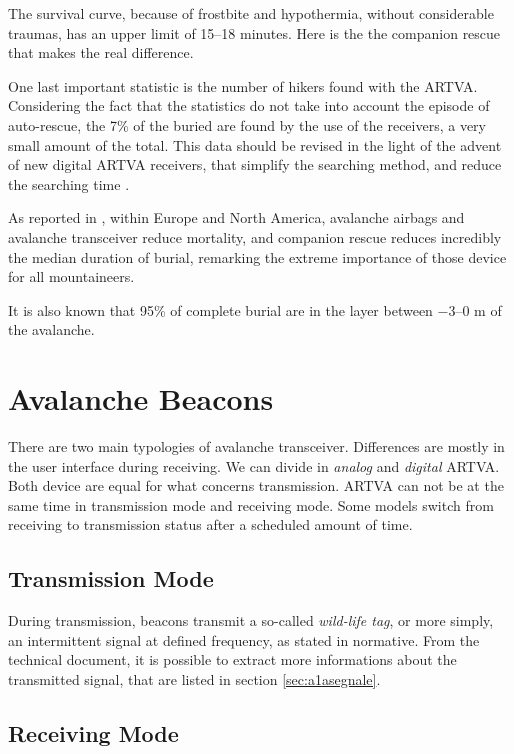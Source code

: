 The survival curve, because of frostbite and hypothermia, without considerable traumas, has an upper limit of 15--18 minutes. Here is the the companion rescue that makes the real difference\cite{ManualeSciAlpinismo}.

One last important statistic is the number of hikers found with the ARTVA. Considering the fact that the statistics do not take into account the episode of auto-rescue, the 7\% of the buried are found by the use of the receivers, a very small amount of the total. This data should be revised in the light of the advent of new digital ARTVA receivers, that simplify the searching method, and reduce the searching time \citep{hereforddigital}. 

As reported in \citep{Brugger2007}, within Europe and North America, avalanche airbags and avalanche transceiver reduce mortality, and companion rescue reduces incredibly the median duration of burial, remarking the extreme importance of those device for all mountaineers.

It is also known that 95\% of complete burial are in the layer between \numrange{-3}{0} \si{\meter} of the avalanche.

\section{Avalanche Beacons}

There are two main typologies of avalanche transceiver. Differences are mostly in the user interface during receiving. We can divide in \emph{analog} and \emph{digital} ARTVA. Both device are equal for what concerns transmission. ARTVA can not be at the same time in transmission mode and receiving mode. Some models switch from receiving to transmission status after a scheduled amount of time. 

\subsection{Transmission Mode}

During transmission, beacons transmit a so-called \emph{wild-life tag}, or more simply, an intermittent signal at defined frequency, as stated in normative\cite{NormativaARVA}. From the technical document, it is possible to extract more informations about the transmitted signal, that are listed in section \ref{sec:a1asegnale}.

\subsection{Receiving Mode}

